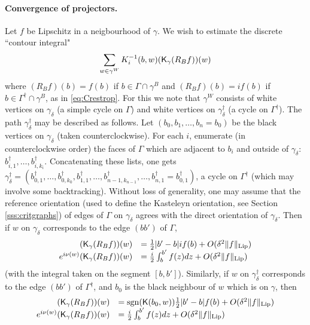 \documentclass[10pt]{article}
\newcommand{\rK}{{\sf K}}
\newcommand{\dg}{\dagger}
\DeclareMathOperator{\sgn}{sgn}
\begin{document}
 
 
\paragraph{Convergence of projectors.} 
Let $f$ be Lipschitz in a neigbourhood of $\gamma$. We wish to estimate the discrete ``contour integral" 
$$\sum_{w\in\gamma^W}K_i^{-1}(b,w)(\rK_\gamma (R_Bf))(w)$$ where $(R_Bf)(b)=f(b)$ if $b\in\Gamma\cap\gamma^B$ and  $(R_Bf)(b)=if(b)$ if $b\in\Gamma^\dg\cap\gamma^B$, as in \eqref{eq:Crestrop}. For this we note that $\gamma^W$ consists of white vertices on $\gamma_\delta$ (a simple cycle on $\Gamma$) and white vertices on $\gamma_\delta^\dg$ (a cycle on $\Gamma^\dg$). The path $\gamma_\delta^\dg$ may be described as follows. Let $(b_0,b_1,\dots,b_n=b_0)$ be the black vertices on $\gamma_\delta$ (taken counterclockwise). For each $i$, enumerate (in counterclockwise order) the faces of $\Gamma$ which are adjacent to $b_i$ and outside of $\gamma_\delta$: $b_{i,1}^\dg,\dots,b_{i,k_i}^\dg$. Concatenating these lists, one gets $\gamma_\delta^\dg=(b_{0,1}^\dg,\dots,b_{0,k_0}^\dg,b_{1,1}^\dg,\dots,b_{n-1,k_{n-1}}^\dg,\dots,b_{n,1}^\dg=b_{0,1}^\dg)$, a cycle on $\Gamma^\dg$ (which may involve some backtracking). Without loss of generality, one may assume that the reference orientation (used to define the Kasteleyn orientation, see Section \ref{sss:critgraphs}) of edges of $\Gamma$ on $\gamma_\delta$ agrees with the direct orientation of $\gamma_\delta$. Then if $w$ on $\gamma_\delta$ corresponds to the edge $(bb')$ of $\Gamma$,
\begin{equation}\label{eq:discrtcontint}
\begin{array}{rl}
(\rK_\gamma (R_Bf))(w)&=\frac 12|b'-b|if(b)+O(\delta^2 \|f\|_{{\rm Lip}})\\
e^{i\nu(w)}(\rK_\gamma (R_Bf))(w)&=\frac i2\int_b^{b'}f(z)dz+O(\delta^2 \|f\|_{{\rm Lip}})
\end{array}
\end{equation}
(with the integral taken on the segment $[b,b']$). Similarly, if $w$ on $\gamma_\delta^\dg$ corresponds to the edge $(bb')$ of $\Gamma^\dg$, and $b_0$ is the black neighbour of $w$ which is on $\gamma$, then
\begin{equation*}%
\begin{array}{rl}
(\rK_\gamma (R_Bf))(w)&=\sgn(\rK(b_0,w))\frac 12|b'-b|f(b)+O(\delta^2 \|f\|_{{\rm Lip}})\\
e^{i\nu(w)}(\rK_\gamma (R_Bf))(w)&=\frac i2\int_b^{b'}f(z)dz+O(\delta^2 \|f\|_{{\rm Lip}})
\end{array}
\end{equation*}
\end{document}
